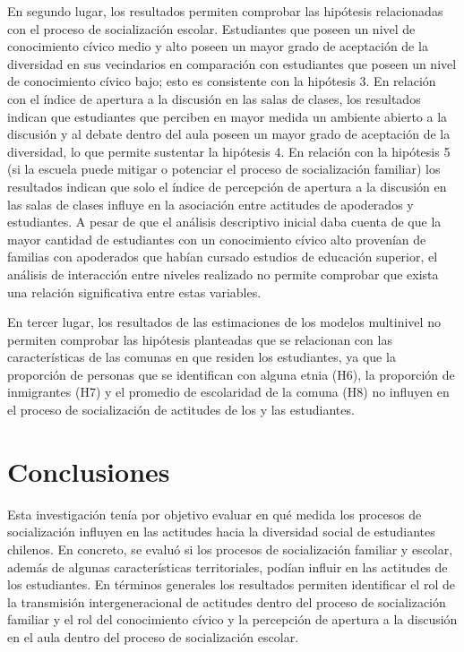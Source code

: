 \documentclass[12pt,twoside]{templates/facsothesis}
\begin{document}
En segundo lugar, los resultados permiten comprobar las hipótesis relacionadas con el proceso de socialización escolar. Estudiantes que poseen un nivel de conocimiento cívico medio y alto poseen un mayor grado de aceptación de la diversidad en sus vecindarios en comparación con estudiantes que poseen un nivel de conocimiento cívico bajo; esto es consistente con la hipótesis 3. En relación con el índice de apertura a la discusión en las salas de clases, los resultados indican que estudiantes que perciben en mayor medida un ambiente abierto a la discusión y al debate dentro del aula poseen un mayor grado de aceptación de la diversidad, lo que permite sustentar la hipótesis 4. En relación con la hipótesis 5 (si la escuela puede mitigar o potenciar el proceso de socialización familiar) los resultados indican que solo el índice de percepción de apertura a la discusión en las salas de clases influye en la asociación entre actitudes de apoderados y estudiantes. A pesar de que el análisis descriptivo inicial daba cuenta de que la mayor cantidad de estudiantes con un conocimiento cívico alto provenían de familias con apoderados que habían cursado estudios de educación superior, el análisis de interacción entre niveles realizado no permite comprobar que exista una relación significativa entre estas variables.

En tercer lugar, los resultados de las estimaciones de los modelos multinivel no permiten comprobar las hipótesis planteadas que se relacionan con las características de las comunas en que residen los estudiantes, ya que la proporción de personas que se identifican con alguna etnia (H6), la proporción de inmigrantes (H7) y el promedio de escolaridad de la comuna (H8) no influyen en el proceso de socialización de actitudes de los y las estudiantes.

\hypertarget{conclusiones}{%
\chapter{Conclusiones}\label{conclusiones}}

Esta investigación tenía por objetivo evaluar en qué medida los procesos de socialización influyen en las actitudes hacia la diversidad social de estudiantes chilenos. En concreto, se evaluó si los procesos de socialización familiar y escolar, además de algunas características territoriales, podían influir en las actitudes de los estudiantes. En términos generales los resultados permiten identificar el rol de la transmisión intergeneracional de actitudes dentro del proceso de socialización familiar y el rol del conocimiento cívico y la percepción de apertura a la discusión en el aula dentro del proceso de socialización escolar.
\end{document}
